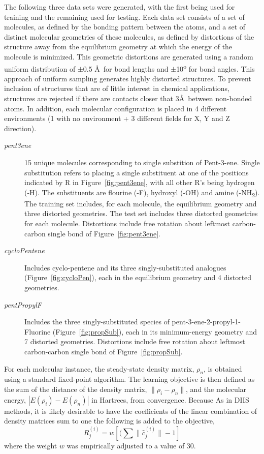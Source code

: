 \documentclass[twoside,11pt]{article}
\begin{document}
The following three data sets were generated, with the first being used for training and the remaining used for testing. Each data set consists of a set of molecules, as defined by the bonding pattern between the atoms, and a set of distinct molecular geometries of these molecules, as defined by distortions of the structure away from the equilibrium geometry at which the energy of the molecule is minimized. This geometric distortions are generated using a random uniform distribution of $\pm$0.5 \AA\ for bond lengths and $\pm$10\textsuperscript{o} for bond angles.  This approach of uniform sampling generates highly distorted structures. To prevent inclusion of structures that are of little interest in chemical applications, structures are rejected if there are contacts closer that 3\AA\ between non-bonded atoms.  In addition, each molecular configuration is placed in 4 different environments (1 with no environment + 3 different fields for X, Y and Z direction).
\begin{description}
\item[\textit{pent3ene}] 15 unique molecules corresponding to single substition of Pent-3-ene. Single substitution refers to placing a single substituent at one of the positions indicated by R in Figure~\ref{fig:pent3ene}, with all other R's being hydrogen (-H). The substituents are flourine (-F), hydroxyl (-OH) and amine (-NH\textsubscript{2}). The training set includes, for each molecule, the equilibrium geometry and three distorted geometries. The test set includes three distorted geometries for each molecule. Distortions include free rotation about leftmost carbon-carbon single bond of Figure~\ref{fig:pent3ene}. 
\item[\textit{cycloPentene}]Includes cyclo-pentene and its three singly-substituted analogues (Figure~\ref{fig:cycloPen}), each in the equilibrium geometry and 4 distorted geometries. 
\item[\textit{pentPropylF}] Includes the three singly-substituted species of pent-3-ene-2-propyl-1-Fluorine (Figure~\ref{fig:propSub}), each in its minimum-energy geometry and 7 distorted geometries. Distortions include free rotation about leftmost carbon-carbon single bond of Figure~\ref{fig:propSub}. 
\end{description}

For each molecular instance, the steady-state density matrix, $\rho_n$, is obtained using a standard fixed-point algorithm\cite{Pulay1980}. The learning objective is then defined as the sum of the distance of the density matrix, $\|\rho_i-\rho_n\|$, and the molecular energy, $|E(\rho_i)-E(\rho_n)|$ in Hartrees, from convergence. Because As in DIIS methods, it is likely desirable to have the coefficients of the linear combination of density matrices sum to one\cite{scusceria} the following is added to the objective,
\begin{equation}
R^{(i)}_j =  w [(\sum \|\hat{c}^{(i)}_j\| - 1]
\end{equation}
where the weight $w$ was empirically adjusted to a value of 30. 
\end{document}
